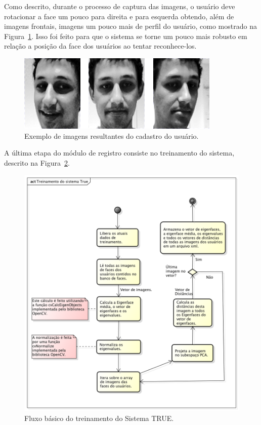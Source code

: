 	Como descrito, durante o processo de captura das imagens, o usuário deve rotacionar a face um pouco para direita e para esquerda obtendo, além de imagens frontais, imagens um pouco mais de perfil do usuário, como mostrado na Figura~\ref{fig:imgs-cadastro}. Isso foi feito para que o sistema se torne um pouco mais robusto em relação a posição da face dos usuários ao tentar reconhece-los.

		\begin{figure}[hbt]
			\begin{center}
				\includegraphics[scale=0.4]{figuras/4.ProblemaEProposta/face-registro.png}
			\end{center}
			\caption{Exemplo de imagens resultantes do cadastro do usuário.}
			\label{fig:imgs-cadastro}
		\end{figure}	

	A última etapa do módulo de registro consiste no treinamento do sistema, descrito na Figura~\ref{fig:treinamento}.

		\begin{figure}[hbt]
			\begin{center}
				\includegraphics[scale=0.5]{figuras/4.ProblemaEProposta/diagrama-registro.png}
			\end{center}
			\caption{Fluxo básico do treinamento do Sistema TRUE.}
			\label{fig:treinamento}
		\end{figure}	